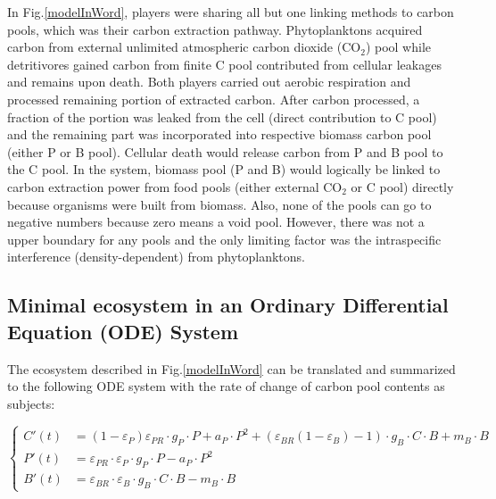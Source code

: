 \documentclass[../thesis.tex]{subfiles} %
\newcommand{\gP}{g_P}
\newcommand{\eP}{\varepsilon_P}
\newcommand{\aP}{a_P}
\newcommand{\ePR}{\varepsilon_{PR}}
\newcommand{\gB}{g_B}
\newcommand{\eB}{\varepsilon_B}
\newcommand{\mB}{m_B}
\newcommand{\eBR}{\varepsilon_{BR}}
\begin{document}
In Fig.\ref{modelInWord}, players were sharing all but one linking methods to carbon pools, which was their carbon extraction pathway.  Phytoplanktons acquired carbon from external unlimited atmospheric carbon dioxide (CO$_2$) pool while detritivores gained carbon from finite C pool contributed from cellular leakages and remains upon death.  Both players carried out aerobic respiration and processed remaining portion of extracted carbon.  After carbon processed, a fraction of the portion was leaked from the cell (direct contribution to C pool) and the remaining part was incorporated into respective biomass carbon pool (either P or B pool).  Cellular death would release carbon from P and B pool to the C pool.  In the system, biomass pool (P and B) would logically be linked to carbon extraction power from food pools (either external CO$_2$ or C pool) directly because organisms were built from biomass.  Also, none of the pools can go to negative numbers because zero means a void pool.  However, there was not a upper boundary for any pools and the only limiting factor was the intraspecific interference (density-dependent) from phytoplanktons.

\subsection{Minimal ecosystem in an Ordinary Differential Equation (ODE) System}
The ecosystem described in Fig.\ref{modelInWord} can be translated and summarized to the following ODE system with the rate of change of carbon pool contents as subjects:

\begin{equation*}\left\{\begin{array}{rl}
    C'(t) &= (1-\eP)\ePR\cdot\gP\cdot P +\aP\cdot P^2 +(\eBR(1-\eB)-1)\cdot\gB\cdot C\cdot B +\mB\cdot B\\
    P'(t) &= \ePR\cdot\eP\cdot\gP\cdot P -\aP\cdot P^2\\
    B'(t) &= \eBR\cdot\eB\cdot\gB\cdot C\cdot B -\mB\cdot B
\end{array}\right.\end{equation*}
\end{document}
